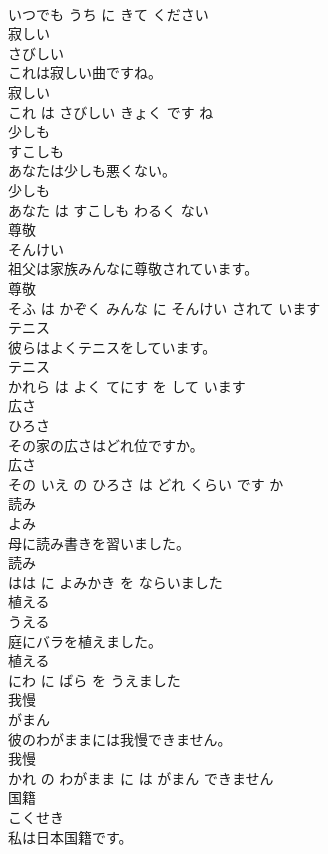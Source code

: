 \documentclass[8pt]{extreport}
\begin{document}
\begin{CJK}{UTF8}{min}
\\	いつでも うち に きて ください			
\\	寂しい	
\\	さびしい			
\\	これは寂しい曲ですね。	
\\	寂しい 
\\	これ は さびしい きょく です ね			
\\	少しも	
\\	すこしも			
\\	あなたは少しも悪くない。	
\\	少しも 
\\	あなた は すこしも わるく ない			
\\	尊敬	
\\	そんけい			
\\	祖父は家族みんなに尊敬されています。	
\\	尊敬 
\\	そふ は かぞく みんな に そんけい されて います			
\\	テニス	
\\	彼らはよくテニスをしています。	
\\	テニス 
\\	かれら は よく てにす を して います			
\\	広さ	
\\	ひろさ			
\\	その家の広さはどれ位ですか。	
\\	広さ 
\\	その いえ の ひろさ は どれ くらい です か			
\\	読み	
\\	よみ			
\\	母に読み書きを習いました。	
\\	読み 
\\	はは に よみかき を ならいました			
\\	植える	
\\	うえる			
\\	庭にバラを植えました。	
\\	植える 
\\	にわ に ばら を うえました			
\\	我慢	
\\	がまん			
\\	彼のわがままには我慢できません。	
\\	我慢 
\\	かれ の わがまま に は がまん できません			
\\	国籍	
\\	こくせき			
\\	私は日本国籍です。	

\end{CJK}
\end{document}
